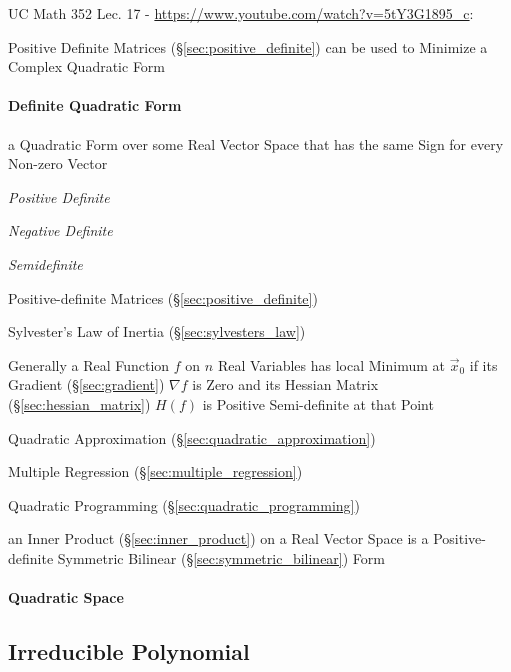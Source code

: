 UC Math 352 Lec. 17 - \url{https://www.youtube.com/watch?v=5tY3G1895_c}:

Positive Definite Matrices (\S\ref{sec:positive_definite}) can be used to
Minimize a Complex Quadratic Form



\paragraph{Definite Quadratic Form}\label{sec:definite_quadratic}\hfill

a Quadratic Form over some Real Vector Space that has the same Sign
for every Non-zero Vector

\emph{Positive Definite}

\emph{Negative Definite}

\emph{Semidefinite}

\fist Positive-definite Matrices (\S\ref{sec:positive_definite})

\fist Sylvester's Law of Inertia (\S\ref{sec:sylvesters_law})

Generally a Real Function $f$ on $n$ Real Variables has local Minimum at
$\vec{x}_0$ if its Gradient (\S\ref{sec:gradient}) $\nabla f$ is Zero and its
Hessian Matrix (\S\ref{sec:hessian_matrix}) $H(f)$ is Positive Semi-definite at
that Point

\fist Quadratic Approximation (\S\ref{sec:quadratic_approximation})

\fist Multiple Regression (\S\ref{sec:multiple_regression})

\fist Quadratic Programming (\S\ref{sec:quadratic_programming})

an Inner Product (\S\ref{sec:inner_product}) on a Real Vector Space is
a Positive-definite Symmetric Bilinear
(\S\ref{sec:symmetric_bilinear}) Form



\paragraph{Quadratic Space}\label{sec:quadratic_space}\hfill



\subsection{Irreducible Polynomial}\label{sec:irreducible_polynomial}

